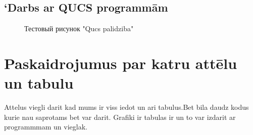 \documentclass{report}
\begin{document}
\subsection{‘Darbs ar QUCS programmām}
\begin{figure}[h]
\caption{Тестовый рисунок "Qucs palidziba"}
\label{fig:image}
\end{figure}
\section {Paskaidrojumus par katru attēlu un tabulu}
Attelus viegli darit kad mums ir viss iedot un ari tabulus.Bet bila daudz kodus kurie nau saprotams bet var darit. Grafiki ir tabulas ir un to var izdarit ar programmmam un vieglak.
\end{document}
